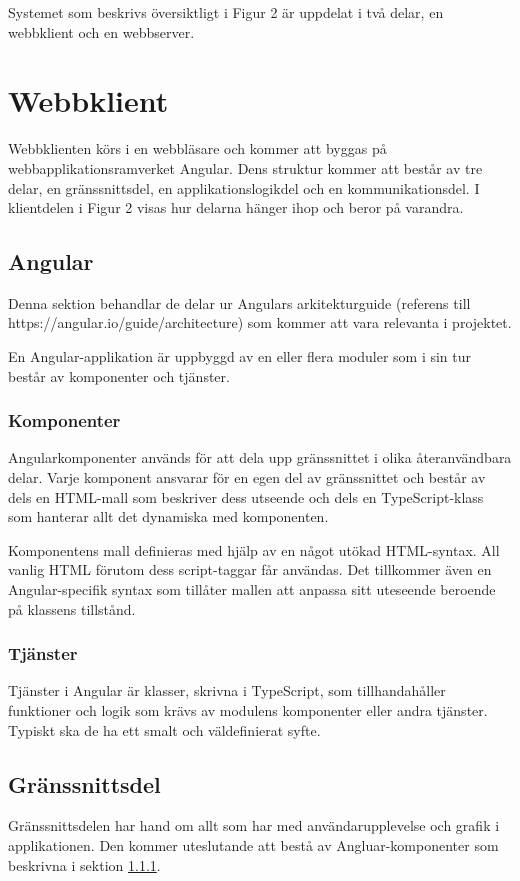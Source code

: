 \documentclass[a4paper,10pt]{article}
\begin{document}
Systemet som beskrivs översiktligt i Figur 2 är uppdelat i två delar, en webbklient och en webbserver.
\section{Webbklient}
\label{sec:webbklient}
Webbklienten körs i en webbläsare och kommer att byggas på webbapplikationsramverket Angular. Dens struktur kommer att består av tre delar, en gränssnittsdel, en applikationslogikdel och en kommunikationsdel. I klientdelen i Figur 2 visas hur delarna hänger ihop och beror på varandra.

\subsection{Angular}
Denna sektion behandlar de delar ur Angulars arkitekturguide (referens till https://angular.io/guide/architecture) som kommer att vara relevanta i projektet.

En Angular-applikation är uppbyggd av en eller flera moduler som i sin tur består av komponenter och tjänster.
\subsubsection{Komponenter}
\label{sec:komponent}
Angularkomponenter används för att dela upp gränssnittet i olika återanvändbara delar. Varje komponent ansvarar för en egen del av gränssnittet och består av dels en HTML-mall som beskriver dess utseende och dels en TypeScript-klass som hanterar allt det dynamiska med komponenten.

Komponentens mall definieras med hjälp av en något utökad HTML-syntax. All vanlig HTML förutom dess script-taggar får användas. Det tillkommer även en Angular-specifik syntax som tillåter mallen att anpassa sitt uteseende beroende på klassens tillstånd.
\subsubsection{Tjänster}
Tjänster i Angular är klasser, skrivna i TypeScript, som tillhandahåller funktioner och logik som krävs av modulens komponenter eller andra tjänster. Typiskt ska de ha ett smalt och väldefinierat syfte.

\subsection{Gränssnittsdel}
Gränssnittsdelen har hand om allt som har med användarupplevelse och grafik i applikationen. Den kommer uteslutande att bestå av Angluar-komponenter som beskrivna i sektion \ref{sec:komponent}.
\end{document}
